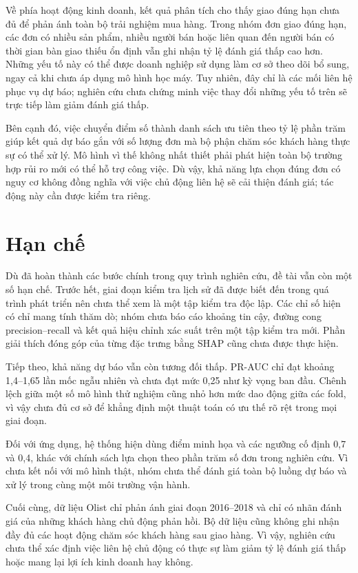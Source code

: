\documentclass[12pt,a4paper]{report}
\begin{document}
Về phía hoạt động kinh doanh, kết quả phân tích cho thấy giao đúng hạn chưa đủ để phản ánh toàn bộ trải nghiệm mua hàng. Trong nhóm đơn giao đúng hạn, các đơn có nhiều sản phẩm, nhiều người bán hoặc liên quan đến người bán có thời gian bàn giao thiếu ổn định vẫn ghi nhận tỷ lệ đánh giá thấp cao hơn. Những yếu tố này có thể được doanh nghiệp sử dụng làm cơ sở theo dõi bổ sung, ngay cả khi chưa áp dụng mô hình học máy. Tuy nhiên, đây chỉ là các mối liên hệ phục vụ dự báo; nghiên cứu chưa chứng minh việc thay đổi những yếu tố trên sẽ trực tiếp làm giảm đánh giá thấp.

Bên cạnh đó, việc chuyển điểm số thành danh sách ưu tiên theo tỷ lệ phần trăm giúp kết quả dự báo gắn với số lượng đơn mà bộ phận chăm sóc khách hàng thực sự có thể xử lý. Mô hình vì thế không nhất thiết phải phát hiện toàn bộ trường hợp rủi ro mới có thể hỗ trợ công việc. Dù vậy, khả năng lựa chọn đúng đơn có nguy cơ không đồng nghĩa với việc chủ động liên hệ sẽ cải thiện đánh giá; tác động này cần được kiểm tra riêng.

\section{Hạn chế}\label{sec:limitations}

Dù đã hoàn thành các bước chính trong quy trình nghiên cứu, đề tài vẫn còn một số hạn chế. Trước hết, giai đoạn kiểm tra lịch sử đã được biết đến trong quá trình phát triển nên chưa thể xem là một tập kiểm tra độc lập. Các chỉ số hiện có chỉ mang tính thăm dò; nhóm chưa báo cáo khoảng tin cậy, đường cong precision--recall và kết quả hiệu chỉnh xác suất trên một tập kiểm tra mới. Phần giải thích đóng góp của từng đặc trưng bằng SHAP cũng chưa được thực hiện.

Tiếp theo, khả năng dự báo vẫn còn tương đối thấp. PR-AUC chỉ đạt khoảng 1,4--1,65 lần mốc ngẫu nhiên và chưa đạt mức 0,25 như kỳ vọng ban đầu. Chênh lệch giữa một số mô hình thử nghiệm cũng nhỏ hơn mức dao động giữa các fold, vì vậy chưa đủ cơ sở để khẳng định một thuật toán có ưu thế rõ rệt trong mọi giai đoạn.

Đối với ứng dụng, hệ thống hiện dùng điểm minh họa và các ngưỡng cố định 0,7 và 0,4, khác với chính sách lựa chọn theo phần trăm số đơn trong nghiên cứu. Vì chưa kết nối với mô hình thật, nhóm chưa thể đánh giá toàn bộ luồng dự báo và xử lý trong cùng một môi trường vận hành.

Cuối cùng, dữ liệu Olist chỉ phản ánh giai đoạn 2016--2018 và chỉ có nhãn đánh giá của những khách hàng chủ động phản hồi. Bộ dữ liệu cũng không ghi nhận đầy đủ các hoạt động chăm sóc khách hàng sau giao hàng. Vì vậy, nghiên cứu chưa thể xác định việc liên hệ chủ động có thực sự làm giảm tỷ lệ đánh giá thấp hoặc mang lại lợi ích kinh doanh hay không.
\end{document}
